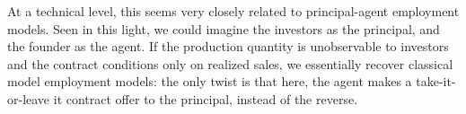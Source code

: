 \documentclass[11pt, oneside]{article}   	%
\begin{document}
At a technical level, this seems very closely related to principal-agent employment models. Seen in this light, we could imagine the investors as the principal, and the founder as the agent. If the production quantity is unobservable to investors and the contract conditions only on realized sales, we essentially recover classical model employment models: the only twist is that here, the agent makes a take-it-or-leave it contract offer to the principal, instead of the reverse.
\end{document}
